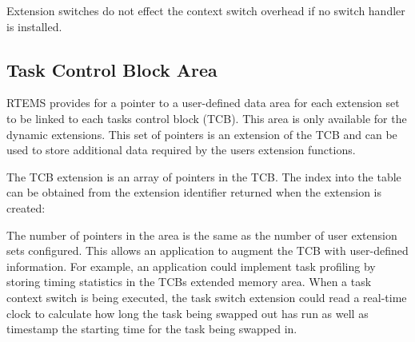 Extension switches do not effect the context switch overhead if no switch handler is installed.\hypertarget{group__ClassicUserExtensions_ClassicUserExtensionsTCB}{}\subsection{Task Control Block Area}\label{group__ClassicUserExtensions_ClassicUserExtensionsTCB}
R\+T\+E\+MS provides for a pointer to a user-\/defined data area for each extension set to be linked to each task\textquotesingle{}s control block (T\+CB). This area is only available for the dynamic extensions. This set of pointers is an extension of the T\+CB and can be used to store additional data required by the user\textquotesingle{}s extension functions.

The T\+CB extension is an array of pointers in the T\+CB. The index into the table can be obtained from the extension identifier returned when the extension is created\+:


\begin{DoxyCode}{0}
\end{DoxyCode}


The number of pointers in the area is the same as the number of user extension sets configured. This allows an application to augment the T\+CB with user-\/defined information. For example, an application could implement task profiling by storing timing statistics in the T\+CB\textquotesingle{}s extended memory area. When a task context switch is being executed, the task switch extension could read a real-\/time clock to calculate how long the task being swapped out has run as well as timestamp the starting time for the task being swapped in.

